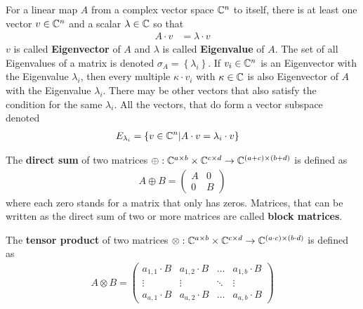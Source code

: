 For a linear map $A$ from a complex vector space $\mathbb{C}^n$ to itself, there is at least one vector $v \in \mathbb{C}^n$ and a scalar $\lambda \in \mathbb{C}$ so that
\begin{align}
    A \cdot v & = \lambda \cdot v
\end{align}
$v$ is called \textbf{Eigenvector} of $A$ and $\lambda$ is called \textbf{Eigenvalue} of $A$.
The set of all Eigenvalues of a matrix is denoted $\sigma_A = \left\{ \lambda_i \right\}$.
If $v_i \in \mathbb{C}^n$ is an Eigenvector with the Eigenvalue $\lambda_i$, then every multiple $\kappa \cdot v_i$ with $\kappa \in \mathbb{C}$ is also Eigenvector of $A$ with the Eigenvalue $\lambda_i$.
There may be other vectors that also satisfy the condition for the same $\lambda_i$.
All the vectors, that do form a vector subspace denoted
\begin{align}
    E_{\lambda_i} & = \left\{ v \in \mathbb{C}^n | A \cdot v = \lambda_i \cdot v \right\}
\end{align}



The \textbf{direct sum} of two matrices $\oplus: \mathbb{C}^{a \times b} \times \mathbb{C}^{c \times d} \to \mathbb{C}^{(a + c) \times (b + d)}$ is defined as
\begin{align}
    A \oplus B = \begin{pmatrix}
        A & 0 \\
        0 & B
    \end{pmatrix}
\end{align}
where each zero stands for a matrix that only has zeros.
Matrices, that can be written as the direct sum of two or more matrices are called \textbf{block matrices}.

The \textbf{tensor product} of two matrices $\otimes: \mathbb{C}^{a \times b} \times \mathbb{C}^{c \times d} \to \mathbb{C}^{(a \cdot c) \times (b \cdot d)}$ is defined as
\begin{align}
    A \otimes B = \begin{pmatrix}
        a_{1, 1} \cdot B & a_{1, 2} \cdot B & \ldots & a_{1, b} \cdot B \\
        \vdots & \vdots & \ddots & \vdots \\
        a_{a, 1} \cdot B & a_{a, 2} \cdot B & \ldots & a_{a, b} \cdot B
    \end{pmatrix}
\end{align}

